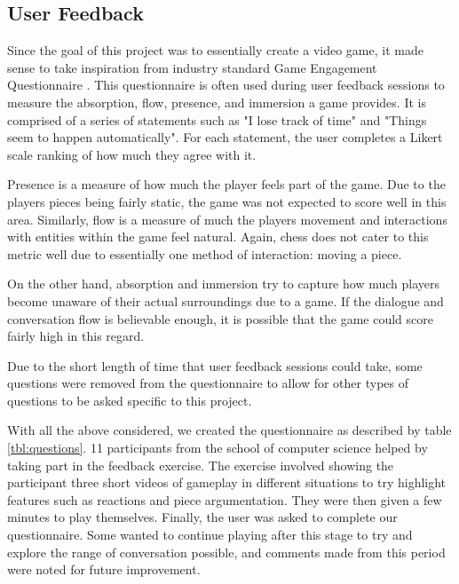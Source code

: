 \documentclass{article}
\begin{document}
\subsection{User Feedback}

Since the goal of this project was to essentially create a video game, it made sense to take inspiration from industry standard Game Engagement Questionnaire \cite{geq}. This questionnaire is often used during user feedback sessions to measure the absorption, flow, presence, and immersion a game provides. It is comprised of a series of statements such as "I lose track of time" and "Things seem to happen automatically". For each statement, the user completes a Likert scale ranking of how much they agree with it.

Presence is a measure of how much the player feels part of the game. Due to the players pieces being fairly static, the game was not expected to score well in this area. Similarly, flow is a measure of much the players movement and interactions with entities within the game feel natural. Again, chess does not cater to this metric well due to essentially one method of interaction: moving a piece. 

On the other hand, absorption and immersion try to capture how much players become unaware of their actual surroundings due to a game. If the dialogue and conversation flow is believable enough, it is possible that the game could score fairly high in this regard.

Due to the short length of time that user feedback sessions could take, some questions were removed from the questionnaire to allow for other types of questions to be asked specific to this project.

With all the above considered, we created the questionnaire as described by table \ref{tbl:questions}. 11 participants from the school of computer science helped by taking part in the feedback exercise. The exercise involved showing the participant three short videos of gameplay in different situations to try highlight features such as reactions and piece argumentation. They were then given a few minutes to play themselves. Finally, the user was asked to complete our questionnaire. Some wanted to continue playing after this stage to try and explore the range of conversation possible, and comments made from this period were noted for future improvement.
\end{document}
